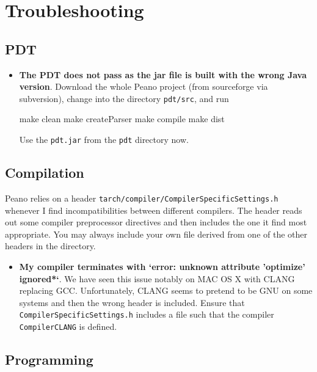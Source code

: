 \chapter{Troubleshooting}

\section{PDT}

\begin{itemize}
  \item {\bf The PDT does not pass as the jar file is built with the wrong Java
  version}. Download the whole Peano project (from sourceforge via subversion),
  change into the directory \texttt{pdt/src}, and run
  \begin{code}
  make clean
  make createParser
  make compile
  make dist
  \end{code}
  Use the \texttt{pdt.jar} from the \texttt{pdt} directory now. 
\end{itemize}





\section{Compilation}

Peano relies on a header \texttt{tarch/compiler/CompilerSpecificSettings.h}
whenever I find incompatibilities between different compilers. 
The header reads out some compiler preprocessor directives and then includes the
one it find most appropriate. 
You may always include your own file derived from one of the other headers in
the directory.


\begin{itemize}
  \item {\bf My compiler terminates with `error: unknown
   attribute 'optimize' ignored*`}. We have seen this issue notably on MAC OS X
   with CLANG replacing GCC. Unfortunately, CLANG seems to pretend to be GNU on
   some systems and then the wrong header is included. Ensure that
   \texttt{CompilerSpecificSettings.h} includes a file such that the compiler
   \texttt{CompilerCLANG} is defined.
\end{itemize}




\section{Programming}

